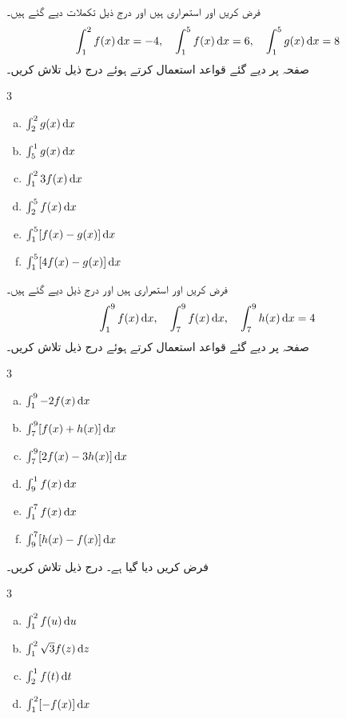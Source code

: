 فرض کریں  اور  استمراری ہیں اور درج ذیل تکملات دیے گئے ہیں۔
\begin{align*}
\int_1^2f(x)\dif x=-4,\quad \int_1^5f(x)\dif x=6,\quad \int_1^5g(x)\dif x=8
\end{align*}
صفحہ  پر دیے گئے قواعد استعمال کرتے ہوئے درج ذیل تلاش کریں۔
\begin{multicols}{3}
\begin{enumerate}[a.]
\item
$\int_2^2g(x)\dif x$
\item
$\int_5^1g(x)\dif x$
\item
$\int_1^23f(x)\dif x$
\item
$\int_2^5f(x)\dif x$
\item
$\int_1^5[f(x)-g(x)]\dif x$
\item
$\int_1^5[4f(x)-g(x)]\dif x$
\end{enumerate}
\end{multicols}
فرض کریں  اور  استمراری ہیں اور درج ذیل دیے گئے ہیں۔
\begin{align*}
\int_1^9f(x)\dif x,\quad \int_7^9f(x)\dif x,\quad \int_7^9h(x)\dif x=4
\end{align*}
صفحہ  پر دیے گئے قواعد استعمال کرتے ہوئے درج ذیل تلاش کریں۔
\begin{multicols}{3}
\begin{enumerate}[a.]
\item
$\int_1^9-2f(x)\dif x$
\item
$\int_7^9[f(x)+h(x)]\dif x$
\item
$\int_7^9[2f(x)-3h(x)]\dif x$
\item
$\int_9^1f(x)\dif x$
\item
$\int_1^7f(x)\dif x$
\item
$\int_9^7[h(x)-f(x)]\dif x$
\end{enumerate}
\end{multicols}
فرض کریں  دیا گیا ہے۔ درج ذیل تلاش کریں۔
\begin{multicols}{3}
\begin{enumerate}[a.]
\item
$\int_1^2f(u)\dif u$
\item
$\int_1^2\sqrt{3}f(z)\dif z$
\item
$\int_2^1f(t)\dif t$
\item
$\int_1^2[-f(x)]\dif x$
\end{enumerate}
\end{multicols}
